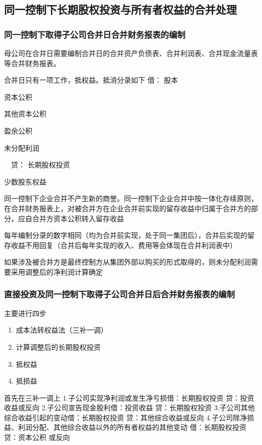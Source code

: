 \documentclass[UTF8,12pt]{ctexart}
\newenvironment{Dr}{\noindent 借：}{\par}
\newenvironment{Cr}{\noindent \ \ 贷：}{\par}
\numberwithin{equation}{section} %
\numberwithin{figure}{section}
\numberwithin{table}{section}
\begin{document}
	\subsection{同一控制下长期股权投资与所有者权益的合并处理}
	\subsubsection{同一控制下取得子公司合并日合并财务报表的编制}
	母公司在合并日需要编制合并日的合并资产负债表、合并利润表、合并现金流量表等合并财务报表。
	
	合并日只有一项工作，抵权益。抵消分录如下
	\begin{Dr}
		股本
		
		资本公积
		
		其他资本公积
		
		盈余公积
		
		未分配利润
	\end{Dr}
	\begin{Cr}
		长期股权投资
		
		少数股东权益
	\end{Cr}
	
	同一控制下企业合并不产生新的商誉。同一控制下企业合并中按一体化存续原则，在合并财务报表上，对被合并方在企业合并前实现的留存收益中归属于合并方的部分，应自合并方资本公积转入留存收益
	
	每年编制分录的数字相同（均为合并前实现，处于同一集团后），合并后实现的留存收益不用回复（合并后每年实现的收入、费用等会体现在合并利润表中）
	
	如果涉及被合并方是最终控制方从集团外部以购买的形式取得的，则未分配利润需要采用调整后的净利润计算确定
	\subsubsection{直接投资及同一控制下取得子公司合并日后合并财务报表的编制}
	主要进行四步
	\begin{enumerate}
		\item 成本法转权益法（三补一调）
		
		\item 计算调整后的长期股权投资
		
		\item 抵权益
		
		\item 抵损益
	\end{enumerate}
	首先在三补一调上
	1.子公司实现净利润或发生净亏损借：长期股权投资
	贷：投资收益或反向
	2.子公司宣告现金股利借：投资收益
	贷：长期股权投资
	3.子公司其他综合收益引起的变动借：长期股权投资
	贷：其他综合收益或反向
	4.子公司除净损益、利润分配、其他综合收益以外的所有者权益的其他变动
	借：长期股权投资贷：资本公积
	或反向
	
\end{document}
